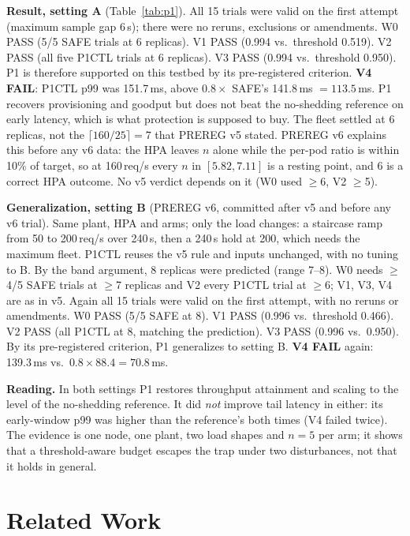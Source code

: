 \documentclass[conference]{IEEEtran}
\begin{document}
\textbf{Result, setting A} (Table~\ref{tab:p1}). All 15 trials were valid on the first
attempt (maximum sample gap 6\,s); there were no reruns, exclusions or
amendments. W0 PASS (5/5 SAFE trials at 6 replicas). V1 PASS (0.994 vs.\
threshold 0.519). V2 PASS (all five P1CTL trials at 6 replicas). V3 PASS
(0.994 vs.\ threshold 0.950). P1 is therefore supported on this testbed by
its pre-registered criterion. \textbf{V4 FAIL}: P1CTL p99 was 151.7\,ms,
above $0.8\times$ SAFE's 141.8\,ms $=113.5$\,ms. P1 recovers provisioning
and goodput but does not beat the no-shedding reference on early latency,
which is what protection is supposed to buy. The fleet settled at 6
replicas, not the $\lceil 160/25\rceil=7$ that PREREG v5 stated. PREREG v6
explains this before any v6 data: the HPA leaves $n$ alone while the per-pod
ratio is within 10\% of target, so at 160\,req/s every $n$ in
$[5.82, 7.11]$ is a resting point, and 6 is a correct HPA outcome. No v5
verdict depends on it (W0 used $\ge$6, V2 $\ge$5).

\textbf{Generalization, setting B} (PREREG v6, committed after v5 and before
any v6 trial). Same plant, HPA and arms; only the load changes: a staircase
ramp from 50 to 200\,req/s over 240\,s, then a 240\,s hold at 200, which
needs the maximum fleet. P1CTL reuses the v5 rule and inputs unchanged, with
no tuning to B. By the band argument, 8 replicas were predicted (range 7--8).
W0 needs $\ge$4/5 SAFE trials at $\ge$7 replicas and V2 every P1CTL trial at
$\ge$6; V1, V3, V4 are as in v5. Again all 15 trials were valid on the first
attempt, with no reruns or amendments. W0 PASS (5/5 SAFE at 8). V1 PASS
(0.996 vs.\ threshold 0.466). V2 PASS (all P1CTL at 8, matching the
prediction). V3 PASS (0.996 vs.\ 0.950). By its pre-registered criterion, P1
generalizes to setting B. \textbf{V4 FAIL} again: 139.3\,ms vs.\
$0.8\times 88.4=70.8$\,ms.

\textbf{Reading.} In both settings P1 restores throughput attainment and
scaling to the level of the no-shedding reference. It did \emph{not}
improve tail latency in either: its early-window p99 was higher than the
reference's both times (V4 failed twice). The evidence is one node, one
plant, two load shapes and $n=5$ per arm; it shows that a threshold-aware
budget escapes the trap under two disturbances, not that it holds in general.

\section{Related Work}
\label{sec:related}
\end{document}
